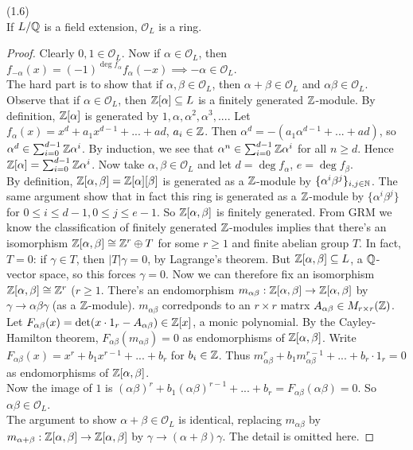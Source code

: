 \documentclass[a4paper]{article}
\begin{document}
\begin{prop} (1.6)\\
If $L/\mathbb{Q}$ is a field extension, $\mathcal{O}_L$ is a ring.
\begin{proof}
Clearly $0,1 \in \mathcal{O}_L$. Now if $\alpha \in \mathcal{O}_L$, then $f_{-\alpha}(x) = (-1)^{\deg f_\alpha} f_\alpha (-x) \implies -\alpha \in \mathcal{O}_L$.\\
The hard part is to show that if $\alpha,\beta \in \mathcal{O}_L$, then $\alpha+\beta \in \mathcal{O}_L$ and $\alpha\beta \in \mathcal{O}_L$.\\
Observe that if $\alpha \in \mathcal{O}_L$, then $\mathbb{Z}[\alpha] \subseteq L$ is a finitely generated $\mathbb{Z}$-module. By definition, $\mathbb{Z}[\alpha]$ is generated by $1,\alpha,\alpha^2,\alpha^3,...$. Let $f_\alpha(x) = x^d + a_1 x^{d-1} + ... + ad$, $a_i \in \mathbb{Z}$. Then $\alpha^d = -(a_1 \alpha^{d-1} + ... + ad)$, so $\alpha^d \in \sum_{i=0}^{d-1} \mathbb{Z} \alpha^i$. By induction, we see that $\alpha^n \in \sum_{i=0}^{d-1} \mathbb{Z} \alpha^i$ for all $n \geq d$. Hence $\mathbb{Z}[\alpha] = \sum_{i=0}^{d-1} \mathbb{Z} \alpha^i$. Now take $\alpha,\beta \in \mathcal{O}_L$ and let $d = \deg f_\alpha$, $e = \deg f_\beta$.\\
By definition, $\mathbb{Z}[\alpha,\beta] =\mathbb{Z}[\alpha][\beta]$ is generated as a $\mathbb{Z}$-module by $\{\alpha^i\beta^j\}_{i,j \in \mathbb{N}}$. The same argument show that in fact this ring is generated as a $\mathbb{Z}$-module by $\{\alpha^i \beta^j\}$ for $0\leq i\leq d-1, 0 \leq j \leq e-1$. So $\mathbb{Z}[\alpha,\beta]$ is finitely generated. From GRM we know the classification of finitely generated $\mathbb{Z}$-modules implies that there's an isomorphism $\mathbb{Z}[\alpha,\beta] \cong \mathbb{Z}^r \oplus T$ for some $r \geq 1$ and finite abelian group $T$. In fact, $T=0$: if $\gamma \in T$, then $|T|\gamma = 0$, by Lagrange's theorem. But $\mathbb{Z}[\alpha,\beta] \subseteq L$, a $\mathbb{Q}$-vector space, so this forces $\gamma = 0$. Now we can therefore fix an isomorphism $\mathbb{Z}[\alpha,\beta] \cong \mathbb{Z}^r$ ($r \geq 1$. There's an endomorphism $m_{\alpha\beta}: \mathbb{Z}[\alpha,\beta] \to \mathbb{Z}[\alpha,\beta]$ by $\gamma \to \alpha\beta\gamma$ (as a $\mathbb{Z}$-module). $m_{\alpha\beta}$ corredponds to an $r \times r$ matrx $A_{\alpha\beta} \in M_{r \times r} (\mathbb{Z})$.\\
Let $F_{\alpha\beta}(x) = \det (x\cdot 1_r -A_{\alpha\beta}) \in \mathbb{Z}[x]$, a monic polynomial. By the Cayley-Hamilton theorem, $F_{\alpha\beta}(m_{\alpha\beta}) = 0$ as endomorphisms of $\mathbb{Z}[\alpha,\beta]$. Write $F_{\alpha\beta}(x) = x^r + b_1x^{r-1} + ... + b_r$ for $b_i \in \mathbb{Z}$. Thus $m^r_{\alpha\beta} + b_1 m^{r-1}_{\alpha\beta} + ... + b_r \cdot 1_r = 0$ as endomorphisms of $\mathbb{Z}[\alpha,\beta]$.\\
Now the image of $1$ is $(\alpha\beta)^r+b_1(\alpha\beta)^{r-1} + ... + b_r = F_{\alpha\beta}(\alpha\beta) = 0$. So $\alpha\beta \in \mathcal{O}_L$.\\
The argument to show $\alpha+\beta \in \mathcal{O}_L$ is identical, replacing $m_{\alpha\beta}$ by $m_{\alpha+\beta}: \mathbb{Z}[\alpha,\beta] \to \mathbb{Z}[\alpha,\beta]$ by $\gamma \to (\alpha+\beta)\gamma$. The detail is omitted here.
\end{proof}
\end{prop}
\end{document}
